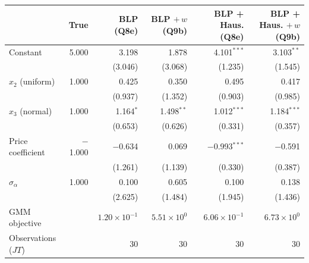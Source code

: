 \begin{tabular}{lrrrrr}
\toprule
 & True & BLP (Q8e) & BLP $+\,w$ (Q9b) & BLP + Haus. (Q8e) & BLP + Haus. $+\,w$ (Q9b) \\
\midrule
Constant & 5.000 & 3.198 & 1.878 & 4.101$^{***}$ & 3.103$^{**}$ \\
 &  & (3.046) & (3.068) & (1.235) & (1.545) \\
$x_2$ (uniform) & 1.000 & 0.425 & 0.350 & 0.495 & 0.417 \\
 &  & (0.937) & (1.352) & (0.903) & (0.985) \\
$x_3$ (normal) & 1.000 & 1.164$^{*}$ & 1.498$^{**}$ & 1.012$^{***}$ & 1.184$^{***}$ \\
 &  & (0.653) & (0.626) & (0.331) & (0.357) \\
Price coefficient & $-$1.000 & $-$0.634 & 0.069 & $-$0.993$^{***}$ & $-$0.591 \\
 &  & (1.261) & (1.139) & (0.330) & (0.387) \\
$\sigma_\alpha$ & 1.000 & 0.100 & 0.605 & 0.100 & 0.138 \\
 &  & (2.625) & (1.484) & (1.945) & (1.436) \\
\midrule
GMM objective &  & $1.20\times10^{-1}$ & $5.51\times10^{0}$ & $6.06\times10^{-1}$ & $6.73\times10^{0}$ \\
Observations ($JT$) &  & 30 & 30 & 30 & 30 \\
\bottomrule
\end{tabular}
